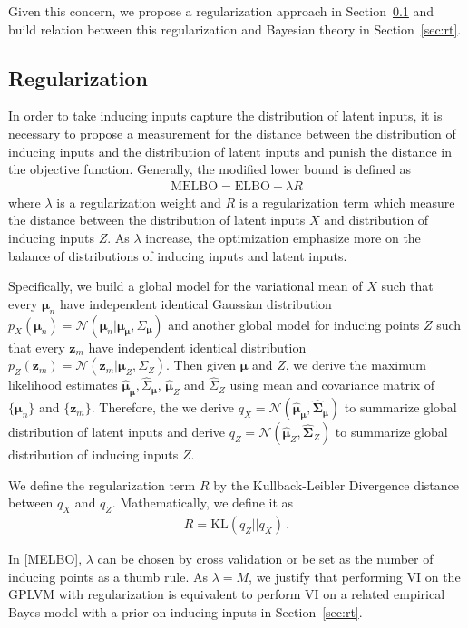 \documentclass{article}
\begin{document}
Given this concern, we propose a regularization approach in Section~\ref{sec:r} and build relation between this regularization and Bayesian theory in Section~\ref{sec:rt}.

\subsection{Regularization} \label{sec:r}
In order to take inducing inputs capture the distribution of latent inputs, it is necessary to propose a measurement for the distance between the distribution of inducing inputs and the distribution of latent inputs and punish the distance in the objective function. Generally, the modified lower bound is defined as
\begin{eqnarray}
\mathrm{MELBO} = \mathrm{ELBO} - \lambda R
\label{MELBO}
\end{eqnarray} 
where $\lambda$ is a regularization weight and $R$ is a regularization term which measure the distance between the distribution of latent inputs $X$ and distribution of inducing inputs $Z$. As $\lambda$ increase, the optimization emphasize more on the balance of distributions of inducing inputs and latent inputs.

Specifically, we build a global model for the variational mean of $X$ such that every $\bm \mu_n$ have independent identical Gaussian distribution $p_X(\bm \mu_n) = \mathcal{N}(\bm \mu_n| \bm \mu_{\bm \mu}, \Sigma_{\bm \mu})$ and another global model for inducing points $Z$ such that every $\bm z_m$ have independent identical distribution $p_Z(\bm z_m) = \mathcal{N}(\bm z_m| \bm \mu_Z, \Sigma_Z)$. Then given $\bm \mu$ and $Z$, we derive the maximum likelihood estimates $\hat{\bm\mu}_{\bm \mu}, \hat{\Sigma}_{\bm \mu}$, $\hat{\bm \mu}_Z$ and $\hat{\Sigma}_Z$ using mean and covariance matrix of $\{\bm \mu_n\}$ and $\{\bm z_m\}$. Therefore, the we derive $q_X = \mathcal{N}(\hat{\bm\mu}_{\bm\mu}, \hat{\bm\Sigma}_{\bm \mu})$ to summarize global distribution of latent inputs and derive
$q_Z = \mathcal{N}(\hat{\bm\mu}_Z, \hat{\bm\Sigma}_Z)$ to summarize global distribution of inducing inputs $Z$.

We define the regularization term $R$ by the Kullback-Leibler Divergence distance between $q_X$ and $q_Z$. Mathematically, we define it as
\begin{eqnarray}
R = \mathrm{KL}(q_Z||q_X)\,.
\end{eqnarray}

In \ref{MELBO}, $\lambda$ can be chosen by cross validation or be set as the number of inducing points as a thumb rule. As $\lambda = M$, we justify that performing VI on the GPLVM with regularization is equivalent to perform VI on a related empirical Bayes model with a prior on inducing inputs in Section~\ref{sec:rt}.
\end{document}
